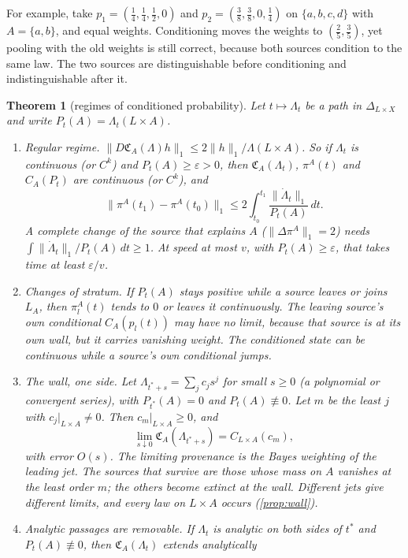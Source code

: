\documentclass[11pt]{article}
\newtheorem{theorem}{Theorem}\newtheorem{proposition}[theorem]{Proposition}\newtheorem{lemma}[theorem]{Lemma}\newtheorem{corollary}[theorem]{Corollary}\newtheorem{conjecture}[theorem]{Conjecture}
\theoremstyle{definition}\newtheorem{definition}[theorem]{Definition}\newtheorem{remark}[theorem]{Remark}\newtheorem{example}[theorem]{Example}
\begin{document}
For example, take $p_1=(\tfrac14,\tfrac14,\tfrac12,0)$ and $p_2=(\tfrac38,\tfrac38,0,\tfrac14)$ on $\{a,b,c,d\}$ with $A=\{a,b\}$, and equal
weights. Conditioning moves the weights to $(\tfrac25,\tfrac35)$, yet pooling with the old weights is still correct, because both sources
condition to the same law. The two sources are distinguishable before conditioning and indistinguishable after it.

\begin{theorem}[regimes of conditioned probability]\label{thm:regimes}
Let $t\mapsto\Lambda_t$ be a path in $\Delta_{L\times X}$ and write $P_t(A)=\Lambda_t(L\times A)$.
\begin{enumerate}
\item[(1)] \emph{Regular regime.} $\|D\mathfrak C_A(\Lambda)h\|_1\le2\|h\|_1/\Lambda(L\times A)$. So if $\Lambda_t$ is continuous (or $C^k$) and $P_t(A)\ge\varepsilon>0$,
  then $\mathfrak C_A(\Lambda_t)$, $\pi^A(t)$ and $C_A(P_t)$ are continuous (or $C^k$), and
  \[
  \|\pi^A(t_1)-\pi^A(t_0)\|_1\le2\int_{t_0}^{t_1}\frac{\|\dot\Lambda_t\|_1}{P_t(A)}\,dt .
  \]
  A complete change of the source that explains $A$ ($\|\Delta\pi^A\|_1=2$) needs $\int\|\dot\Lambda_t\|_1/P_t(A)\,dt\ge1$. At speed at most $v$, with
  $P_t(A)\ge\varepsilon$, that takes time at least $\varepsilon/v$.
\item[(2)] \emph{Changes of stratum.} If $P_t(A)$ stays positive while a source leaves or joins $L_A$, then $\pi^A_l(t)$ tends to $0$ or
  leaves it continuously. The leaving source's own conditional $C_A(p_l(t))$ may have no limit, because that source is at its own wall,
  but it carries vanishing weight. The conditioned state can be continuous while a source's own conditional jumps.
\item[(3)] \emph{The wall, one side.} Let $\Lambda_{t^*+s}=\sum_jc_js^j$ for small $s\ge0$ (a polynomial or convergent series), with $P_{t^*}(A)=0$ and
  $P_t(A)\not\equiv0$. Let $m$ be the least $j$ with $c_j|_{L\times A}\ne0$. Then $c_m|_{L\times A}\ge0$, and
  \[
  \lim_{s\downarrow0}\mathfrak C_A(\Lambda_{t^*+s})=C_{L\times A}(c_m),
  \]
  with error $O(s)$. The limiting provenance is the Bayes weighting of the leading jet. The sources that survive are those whose
  mass on $A$ vanishes at the least order $m$; the others become extinct at the wall. Different jets give different limits, and every
  law on $L\times A$ occurs (\cref{prop:wall}).
\item[(4)] \emph{Analytic passages are removable.} If $\Lambda_t$ is analytic on both sides of $t^*$ and $P_t(A)\not\equiv0$, then $\mathfrak C_A(\Lambda_t)$ extends analytically

\end{enumerate}
\end{theorem}
\end{document}
